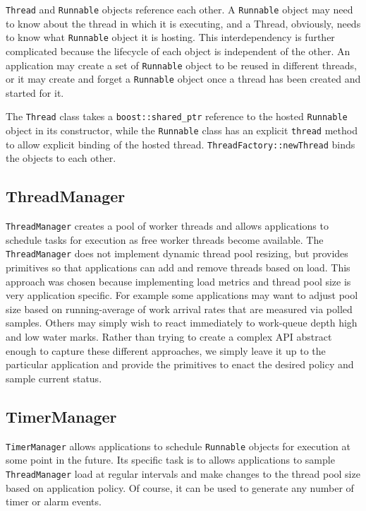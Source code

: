 \documentclass[nocopyrightspace,blockstyle]{sigplanconf}
\begin{document}
\texttt{Thread} and \texttt{Runnable} objects reference each other. A \texttt{Runnable}
object may need to know about the thread in which it is executing, and a Thread, obviously,
needs to know what \texttt{Runnable} object it is hosting. This interdependency is
further complicated because the lifecycle of each object is independent of the
other. An application may create a set of \texttt{Runnable} object to be reused in different threads, or it may create and forget a \texttt{Runnable} object
once a thread has been created and started for it. 

The \texttt{Thread} class takes a \texttt{boost::shared\_ptr} reference to the hosted
\texttt{Runnable} object in its constructor, while the \texttt{Runnable} class has an
explicit \texttt{thread} method to allow explicit binding of the hosted thread.
\texttt{ThreadFactory::newThread} binds the objects to each other.

\subsection{ThreadManager}

\texttt{ThreadManager} creates a pool of worker threads and 
allows applications to schedule tasks for execution as free worker threads
become available. The \texttt{ThreadManager} does not implement dynamic 
thread pool resizing, but provides primitives so that applications can add
and remove threads based on load. This approach was chosen because 
implementing load metrics and thread pool size is very application 
specific. For example some applications may want to adjust pool size based
on running-average of work arrival rates that are measured via polled
samples. Others may simply wish to react immediately to work-queue
depth high and low water marks. Rather than trying to create a complex
API abstract enough to capture these different approaches, we 
simply leave it up to the particular application and provide the 
primitives to enact the desired policy and sample current status.

\subsection{TimerManager}

\texttt{TimerManager} allows applications to schedule
 \texttt{Runnable} objects for execution at some point in the future. Its specific task 
is to allows applications to sample \texttt{ThreadManager} load at regular
intervals and make changes to the thread pool size based on application policy.
Of course, it can be used to generate any number of timer or alarm events.
\end{document}
